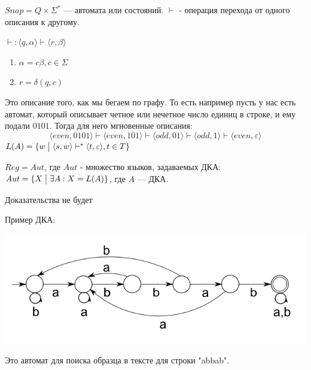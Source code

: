 $Snap = Q \times \Sigma^*$ ---  автомата или состояний.  $\vdash$ - операция перехода от одного описания к другому.

$\vdash: \langle q, \alpha \rangle \vdash \langle r,\beta\rangle$
\begin{enumerate}
    \item $\alpha = c\beta , c \in \Sigma$
    \item $r = \delta( q,c)$
\end{enumerate}

Это описание того, как мы бегаем по графу. То есть например пусть у нас есть автомат, который описывает четное или нечетное число единиц в строке, и ему подали $0101$. Тогда для него мгновенные описания:
$$\langle even, 0101\rangle \vdash \langle even, 101\rangle \vdash \langle odd, 01\rangle \vdash \langle odd , 1\rangle \vdash \langle even, \varepsilon\rangle$$
 $L(A) = \{w \bigm| \langle s,w\rangle \vdash^* \langle t, \varepsilon\rangle, t \in T\}$


$Reg = Aut$, где $Aut$ - множество языков, задаваемых ДКА: $Aut = \{ X \bigm| \exists A: X = L(A)\}$, где $A$ --- ДКА.

Доказательства не будет

Пример ДКА:

\begin{center}
    \includegraphics[width = 14cm]{assets/7_4_1.png}
\end{center}

Это автомат для поиска образца в тексте для строки "abbab".